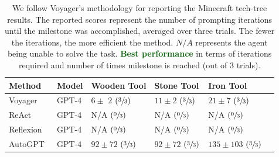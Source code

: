 \documentclass{article}
\newcommand{\greentext}[1]{\textcolor{darkgreen}{\textbf{#1}}}
\begin{document}
\begin{table}[t]
\scriptsize
\centering
\caption{We follow Voyager's methodology \citep{wang2023voyager} for reporting the Minecraft tech-tree results. The reported scores represent the number of prompting iterations until the milestone was accomplished, averaged over three trials. The fewer the iterations, the more efficient the method. $N/A$ represents the agent being unable to solve the task. \greentext{Best performance} in terms of iterations required and number of times milestone is reached (out of $3$ trials).}
\label{table:tech_tree}
{\tabcolsep=8pt
\begin{tabularx}{\textwidth}{l l *{4}{X}}
\toprule
\textbf{Method} & \textbf{Model} & \textbf{Wooden Tool} & \textbf{Stone Tool} & \textbf{Iron Tool} \\
\midrule
Voyager~\citeyearpar{wang2023voyager}
& GPT-4 & $6 \pm$ \tiny{$2$} $(\sfrac{3}{3})$ & $11 \pm$\tiny{$2$} $(\sfrac{3}{3})$ & $21 \pm$\tiny{$7$} $(\sfrac{3}{3})$ \\
ReAct~\citeyearpar{wang2023voyager} & GPT-4 & N/A $(\sfrac{0}{3})$ & N/A $(\sfrac{0}{3})$ & N/A $(\sfrac{0}{3})$\\
Reflexion~\citeyearpar{wang2023voyager} & GPT-4 & N/A $(\sfrac{0}{3})$ & N/A $(\sfrac{0}{3})$&N/A $(\sfrac{0}{3})$\\
AutoGPT~\citeyearpar{wang2023voyager} & GPT-4&  $92 \pm$\tiny{$72$} ${(\sfrac{3}{3})}$ & $92 \pm$\tiny{$72$} ${(\sfrac{3}{3})}$ & $135 \pm$\tiny{$103$} ${(\sfrac{3}{3})}$\\


\end{tabularx}}
\end{table}
\end{document}

